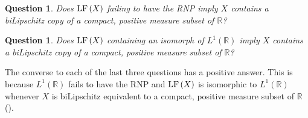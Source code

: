 \documentclass[12pt]{amsart}
\newtheorem{question}[theorem]{Question}
\theoremstyle{definition}
\numberwithin{equation}{section}
\def \R {\mathbb{R}}
\begin{document}
\begin{question}
Does $\LF{X}$ failing to have the RNP imply $X$ contains a biLipschitz copy of a compact, positive measure subset of $\R$?
\end{question}

\begin{question}
Does $\LF{X}$ containing an isomorph of $L^1(\R)$ imply $X$ contains a biLipschitz copy of a compact, positive measure subset of $\R$?
\end{question}

The converse to each of the last three questions has a positive answer. This is because $L^1(\R)$ fails to have the RNP and $\LF{X}$ is isomorphic to $L^1(\R)$ whenever $X$ is biLipschitz equivalent to a compact, positive measure subset of $\R$ (\cite[Corollary 3.4]{Godard}).




\end{document}
